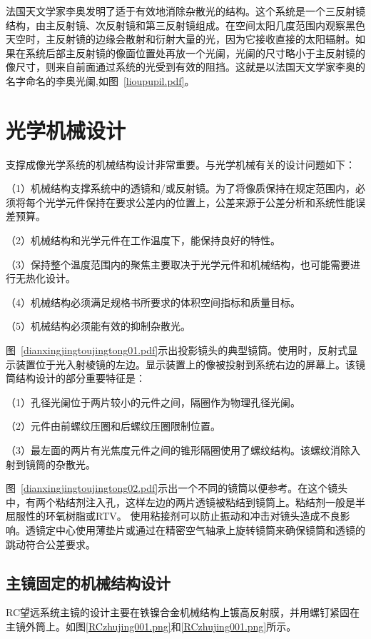 法国天文学家李奥发明了适于有效地消除杂散光的结构。这个系统是一个三反射镜结构，由主反射镜、次反射镜和第三反射镜组成。在空间太阳几度范围内观察黑色天空时，主反射镜的边缘会散射和衍射大量的光，因为它接收直接的太阳辐射。如果在系统后部主反射镜的像面位置处再放一个光阑，光阑的尺寸略小于主反射镜的像尺寸，则来自前面通过系统的光受到有效的阻挡。这就是以法国天文学家李奥的名字命名的李奥光阑,如图~\ref{lioupupil.pdf}。



\section{光学机械设计}
支撑成像光学系统的机械结构设计非常重要\citep{Yoder.2006}。与光学机械有关的设计问题如下：

（1）机械结构支撑系统中的透镜和/或反射镜。为了将像质保持在规定范围内，必须将每个光学元件保持在要求公差内的位置上，公差来源于公差分析和系统性能误差预算。

（2）机械结构和光学元件在工作温度下，能保持良好的特性。

（3）保持整个温度范围内的聚焦主要取决于光学元件和机械结构，也可能需要进行无热化设计。

（4）机械结构必须满足规格书所要求的体积空间指标和质量目标。

（5）机械结构必须能有效的抑制杂散光。




图~\ref{dianxingjingtoujingtong01.pdf}示出投影镜头的典型镜筒。使用时，反射式显示装置位于光入射棱镜的左边。显示装置上的像被投射到系统右边的屏幕上。该镜筒结构设计的部分重要特征是：

（1）孔径光阑位于两片较小的元件之间，隔圈作为物理孔径光阑。

（2）元件由前螺纹压圈和后螺纹压圈限制位置。

（3）最左面的两片有光焦度元件之间的锥形隔圈使用了螺纹结构。该螺纹消除入射到镜筒的杂散光。

图~\ref{dianxingjingtoujingtong02.pdf}示出一个不同的镜筒以便参考。在这个镜头中，有两个粘结剂注入孔，这样左边的两片透镜被粘结到镜筒上。粘结剂一般是半屈服性的环氧树脂或RTV。
使用粘接剂可以防止振动和冲击对镜头造成不良影响。透镜定中心使用薄垫片或通过在精密空气轴承上旋转镜筒来确保镜筒和透镜的跳动符合公差要求。
\subsection{主镜固定的机械结构设计}
RC望远系统主镜的设计主要在铁镍合金机械结构上镀高反射膜，并用螺钉紧固在主镜外筒上。如图\ref{RCzhujing001.png}和\ref{RCzhujing001.png}所示。

